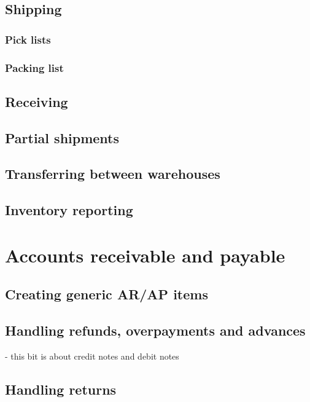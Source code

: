 \documentclass[10pt,A4]{book}
\begin{document}
\section{Shipping}

\subsection{Pick lists}
\subsection{Packing list}

\section{Receiving}

\section{Partial shipments}

\section{Transferring between warehouses}

\section{Inventory reporting}



\chapter{Accounts receivable and payable}

\section{Creating generic AR/AP items}

\section{Handling refunds, overpayments and advances}

- this bit is about credit notes and debit notes

\section{Handling returns}
\end{document}
